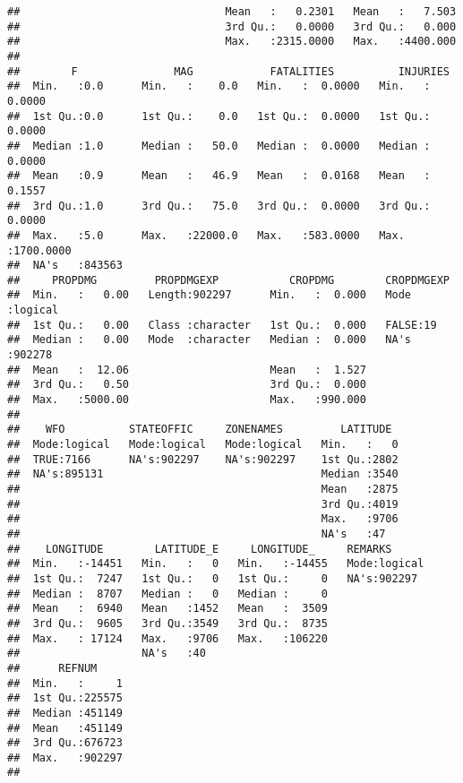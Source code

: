 \documentclass[]{article}
\begin{document}
\begin{verbatim}
##                                Mean   :   0.2301   Mean   :   7.503  
##                                3rd Qu.:   0.0000   3rd Qu.:   0.000  
##                                Max.   :2315.0000   Max.   :4400.000  
##                                                                      
##        F               MAG            FATALITIES          INJURIES        
##  Min.   :0.0      Min.   :    0.0   Min.   :  0.0000   Min.   :   0.0000  
##  1st Qu.:0.0      1st Qu.:    0.0   1st Qu.:  0.0000   1st Qu.:   0.0000  
##  Median :1.0      Median :   50.0   Median :  0.0000   Median :   0.0000  
##  Mean   :0.9      Mean   :   46.9   Mean   :  0.0168   Mean   :   0.1557  
##  3rd Qu.:1.0      3rd Qu.:   75.0   3rd Qu.:  0.0000   3rd Qu.:   0.0000  
##  Max.   :5.0      Max.   :22000.0   Max.   :583.0000   Max.   :1700.0000  
##  NA's   :843563                                                           
##     PROPDMG         PROPDMGEXP           CROPDMG        CROPDMGEXP     
##  Min.   :   0.00   Length:902297      Min.   :  0.000   Mode :logical  
##  1st Qu.:   0.00   Class :character   1st Qu.:  0.000   FALSE:19       
##  Median :   0.00   Mode  :character   Median :  0.000   NA's :902278   
##  Mean   :  12.06                      Mean   :  1.527                  
##  3rd Qu.:   0.50                      3rd Qu.:  0.000                  
##  Max.   :5000.00                      Max.   :990.000                  
##                                                                        
##    WFO          STATEOFFIC     ZONENAMES         LATITUDE   
##  Mode:logical   Mode:logical   Mode:logical   Min.   :   0  
##  TRUE:7166      NA's:902297    NA's:902297    1st Qu.:2802  
##  NA's:895131                                  Median :3540  
##                                               Mean   :2875  
##                                               3rd Qu.:4019  
##                                               Max.   :9706  
##                                               NA's   :47    
##    LONGITUDE        LATITUDE_E     LONGITUDE_     REMARKS       
##  Min.   :-14451   Min.   :   0   Min.   :-14455   Mode:logical  
##  1st Qu.:  7247   1st Qu.:   0   1st Qu.:     0   NA's:902297   
##  Median :  8707   Median :   0   Median :     0                 
##  Mean   :  6940   Mean   :1452   Mean   :  3509                 
##  3rd Qu.:  9605   3rd Qu.:3549   3rd Qu.:  8735                 
##  Max.   : 17124   Max.   :9706   Max.   :106220                 
##                   NA's   :40                                    
##      REFNUM      
##  Min.   :     1  
##  1st Qu.:225575  
##  Median :451149  
##  Mean   :451149  
##  3rd Qu.:676723  
##  Max.   :902297  
## 
\end{verbatim}
\end{document}
